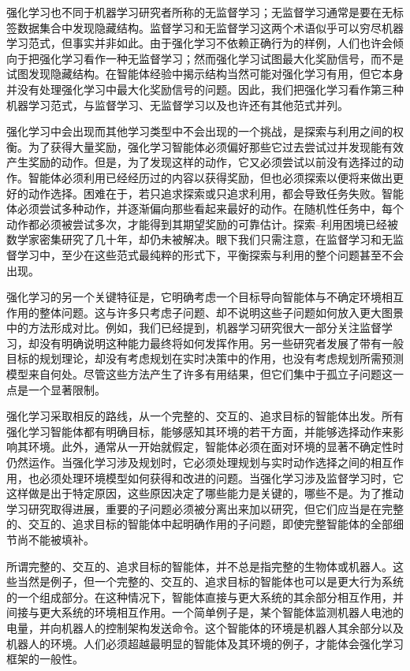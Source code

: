 \documentclass[UTF8, 12pt, fontset=fandol, oneside]{ctexart}
\begin{document}
强化学习也不同于机器学习研究者所称的无监督学习；无监督学习通常是要在无标签数据集合中发现隐藏结构。监督学习和无监督学习这两个术语似乎可以穷尽机器学习范式，但事实并非如此。由于强化学习不依赖正确行为的样例，人们也许会倾向于把强化学习看作一种无监督学习；然而强化学习试图最大化奖励信号，而不是试图发现隐藏结构。在智能体经验中揭示结构当然可能对强化学习有用，但它本身并没有处理强化学习中最大化奖励信号的问题。因此，我们把强化学习看作第三种机器学习范式，与监督学习、无监督学习以及也许还有其他范式并列。

强化学习中会出现而其他学习类型中不会出现的一个挑战，是探索与利用之间的权衡。为了获得大量奖励，强化学习智能体必须偏好那些它过去尝试过并发现能有效产生奖励的动作。但是，为了发现这样的动作，它又必须尝试以前没有选择过的动作。智能体必须利用已经经历过的内容以获得奖励，但也必须探索以便将来做出更好的动作选择。困难在于，若只追求探索或只追求利用，都会导致任务失败。智能体必须尝试多种动作，并逐渐偏向那些看起来最好的动作。在随机性任务中，每个动作都必须被尝试多次，才能得到其期望奖励的可靠估计。探索--利用困境已经被数学家密集研究了几十年，却仍未被解决。眼下我们只需注意，在监督学习和无监督学习中，至少在这些范式最纯粹的形式下，平衡探索与利用的整个问题甚至不会出现。

强化学习的另一个关键特征是，它明确考虑一个目标导向智能体与不确定环境相互作用的整体问题。这与许多只考虑子问题、却不说明这些子问题如何放入更大图景中的方法形成对比。例如，我们已经提到，机器学习研究很大一部分关注监督学习，却没有明确说明这种能力最终将如何发挥作用。另一些研究者发展了带有一般目标的规划理论，却没有考虑规划在实时决策中的作用，也没有考虑规划所需预测模型来自何处。尽管这些方法产生了许多有用结果，但它们集中于孤立子问题这一点是一个显著限制。

强化学习采取相反的路线，从一个完整的、交互的、追求目标的智能体出发。所有强化学习智能体都有明确目标，能够感知其环境的若干方面，并能够选择动作来影响其环境。此外，通常从一开始就假定，智能体必须在面对环境的显著不确定性时仍然运作。当强化学习涉及规划时，它必须处理规划与实时动作选择之间的相互作用，也必须处理环境模型如何获得和改进的问题。当强化学习涉及监督学习时，它这样做是出于特定原因，这些原因决定了哪些能力是关键的，哪些不是。为了推动学习研究取得进展，重要的子问题必须被分离出来加以研究，但它们应当是在完整的、交互的、追求目标的智能体中起明确作用的子问题，即使完整智能体的全部细节尚不能被填补。

所谓完整的、交互的、追求目标的智能体，并不总是指完整的生物体或机器人。这些当然是例子，但一个完整的、交互的、追求目标的智能体也可以是更大行为系统的一个组成部分。在这种情况下，智能体直接与更大系统的其余部分相互作用，并间接与更大系统的环境相互作用。一个简单例子是，某个智能体监测机器人电池的电量，并向机器人的控制架构发送命令。这个智能体的环境是机器人其余部分以及机器人的环境。人们必须超越最明显的智能体及其环境的例子，才能体会强化学习框架的一般性。
\end{document}
